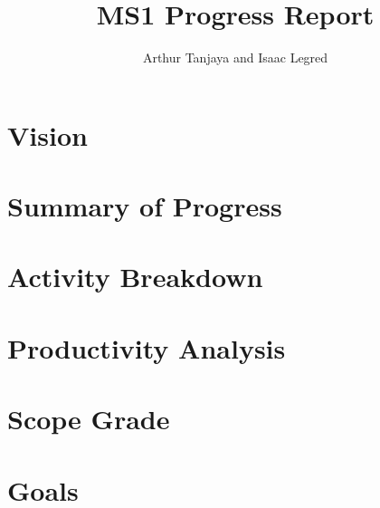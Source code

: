 \documentclass{article}
\title{MS1 Progress Report}
\author{Arthur Tanjaya and Isaac Legred}
\begin{document}
\section{Vision}
\label{sec:vision}

\section{Summary of Progress}
\label{sec:summary}

\section{Activity Breakdown}
\label{sec:activity}

\section{Productivity Analysis}
\label{sec:productivity}

\section{Scope Grade}
\label{sec:scope}

\section{Goals}
\label{sec:goals}
\end{document}
